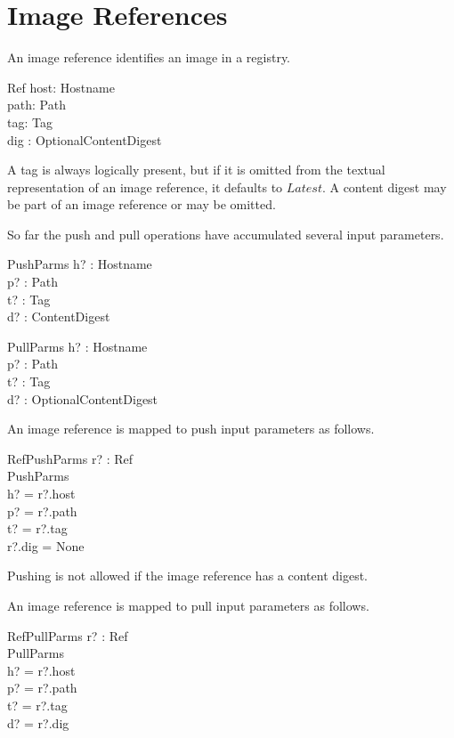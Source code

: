 \documentclass[a4paper,twoside,12pt]{article}
\begin{document}
\newpage
\section{Image References}

An image reference identifies an image in a registry.
\begin{schema}{Ref}
    host: Hostname \\
    path: Path \\
    tag: Tag \\
    dig : OptionalContentDigest \\
\end{schema}
A tag is always logically present, but if it is omitted from the textual representation of an image reference, it defaults to $Latest$.
A content digest may be part of an image reference or may be omitted.

So far the push and pull operations have accumulated several input parameters.
\begin{schema}{PushParms}
    h? : Hostname \\
    p? : Path \\
    t? : Tag \\
    d? : ContentDigest \\
\end{schema}
\begin{schema}{PullParms}
    h? : Hostname \\
    p? : Path \\
    t? : Tag \\
    d? : OptionalContentDigest \\
\end{schema}

An image reference is mapped to push input parameters as follows.
\begin{schema}{RefPushParms}
    r? : Ref \\
    PushParms \\
\where
    h? = r?.host \\
    p? = r?.path \\
    t? = r?.tag \\
    r?.dig = None \\
\end{schema}
Pushing is not allowed if the image reference has a content digest.

An image reference is mapped to pull input parameters as follows.
\begin{schema}{RefPullParms}
    r? : Ref \\
    PullParms \\
\where
    h? = r?.host \\
    p? = r?.path \\
    t? = r?.tag \\
    d? = r?.dig \\
\end{schema}
\end{document}
